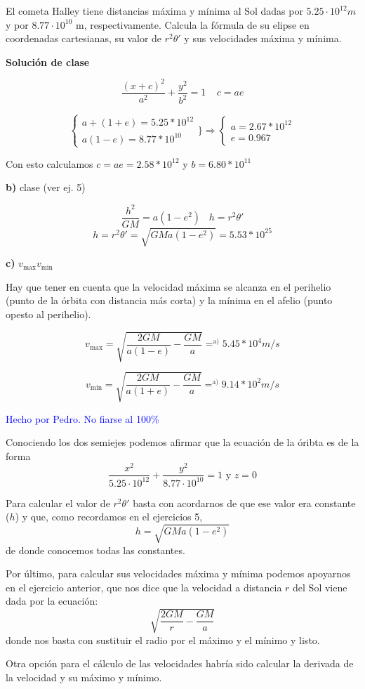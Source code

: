 \begin{problem}[7]
El cometa Halley tiene distancias máxima y mínima al Sol dadas por $5.25\cdot 10^{12} m$ y por $8.77\cdot10^{10}$ m, respectivamente. Calcula la fórmula de su elipse en coordenadas cartesianas, su valor de $r^2\theta'$ y sus velocidades máxima y mínima.

\solution

\textbf{Solución de clase}

$$ \frac{(x+c)^2}{a^2} + \frac{y^2}{b^2} =  1 \;\;\;\; c = a e $$

$$ \begin{cases}
		a + (1+e) = 5.25 * 10^{12} \\
		a(1-e) = 8.77 * 10^{10}
	\end{cases} \} \Rightarrow \begin{cases}
		a = 2.67 * 10^{12} \\
		e = 0.967
	\end{cases}$$

	Con esto calculamos $c = a e = 2.58 * 10^{12}$ y $b = 6.80 * 10^{11}$

\textbf{b)} clase (ver ej. 5)

$$ \frac{h^2}{GM} = a(1- e^2) \;\;\; h = r^2 \theta' $$
$$ h = r^2 \theta' = \sqrt{GMa(1 - e^2)} = 5.53 * 10^{25} $$

\textbf{c)} $v_{\text{max}} v_{\text{min}}$

Hay que tener en cuenta que la velocidad máxima se alcanza en el perihelio (punto de la órbita con distancia más corta) y la mínima en el afelio (punto opesto al perihelio).

$$ v_{\text{max}} = \sqrt{\frac{2GM}{a(1-e)} - \frac{GM}{a}} =^{\text{a)}} 5.45 * 10^4 m/s $$

$$ v_{\text{min}} = \sqrt{\frac{2GM}{a(1+e)} - \frac{GM}{a}} =^{\text{a)}} 9.14 * 10^2 m/s $$


\textcolor{blue}{Hecho por Pedro. No fiarse al 100\%}

Conociendo los dos semiejes podemos afirmar que la ecuación de la óribta es de la forma
\[\frac{x^2}{5.25\cdot 10^{12}}+\frac{y^2}{8.77\cdot 10^{10}} = 1 \text{ y } z=0\]

Para calcular el valor de $r^2 \theta'$ basta con acordarnos de que ese valor era constante ($h$) y que, como recordamos en el ejercicios 5,
\[h = \sqrt{GMa(1-e^2)}\]
de donde conocemos todas las constantes.

Por último, para calcular sus velocidades máxima y mínima podemos apoyarnos en el ejercicio anterior, que nos dice que la velocidad a distancia $r$ del Sol viene dada por la ecuación:
\[\sqrt{\frac{2GM}{r}-\frac{GM}{a}}\]
donde nos basta con sustituir el radio por el máximo y el mínimo y listo.

Otra opción para el cálculo de las velocidades habría sido calcular la derivada de la velocidad y su máximo y mínimo.

\end{problem}

